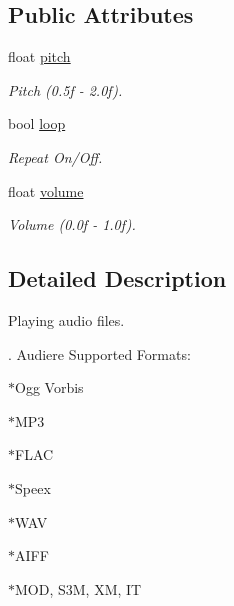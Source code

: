 \subsection*{Public Attributes}
\begin{DoxyCompactItemize}
\item 
\hypertarget{class_f2_c_1_1_audio_file_ad0ce4cee39219b8d70c5a6609d2ca377}{
float \hyperlink{class_f2_c_1_1_audio_file_ad0ce4cee39219b8d70c5a6609d2ca377}{pitch}}
\label{class_f2_c_1_1_audio_file_ad0ce4cee39219b8d70c5a6609d2ca377}

\begin{DoxyCompactList}\small\item\em Pitch (0.5f -\/ 2.0f). \item\end{DoxyCompactList}\item 
\hypertarget{class_f2_c_1_1_audio_file_a056116d003867cd170543451619ee661}{
bool \hyperlink{class_f2_c_1_1_audio_file_a056116d003867cd170543451619ee661}{loop}}
\label{class_f2_c_1_1_audio_file_a056116d003867cd170543451619ee661}

\begin{DoxyCompactList}\small\item\em Repeat On/Off. \item\end{DoxyCompactList}\item 
\hypertarget{class_f2_c_1_1_audio_file_afb17d9b8bffe29de4dad2c86919de313}{
float \hyperlink{class_f2_c_1_1_audio_file_afb17d9b8bffe29de4dad2c86919de313}{volume}}
\label{class_f2_c_1_1_audio_file_afb17d9b8bffe29de4dad2c86919de313}

\begin{DoxyCompactList}\small\item\em Volume (0.0f -\/ 1.0f). \item\end{DoxyCompactList}\end{DoxyCompactItemize}


\subsection{Detailed Description}
Playing audio files. \par
. Audiere Supported Formats: \par
 $\ast$Ogg Vorbis \par
 $\ast$MP3 \par
 $\ast$FLAC \par
 $\ast$Speex \par
 $\ast$WAV \par
 $\ast$AIFF \par
 $\ast$MOD, S3M, XM, IT \par
 

